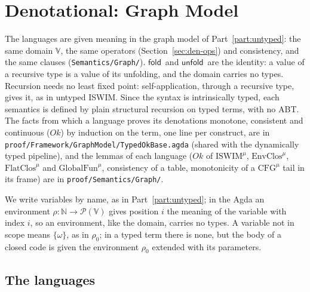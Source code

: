 \documentclass[10pt]{article}
\theoremstyle{acmplain}
\newcommand{\key}[1]{\mathsf{#1}}
\newcommand{\SET}[1]{\mathcal{P}(#1)}
\newcommand{\V}{\mathbb{V}}
\newcommand{\Ml}[1]{\textrm{#1}^{\mu}}                  %
\newcommand{\Mfold}{\key{fold}\,}
\newcommand{\Munfold}{\key{unfold}\,}
\begin{document}
\section{Denotational: Graph Model}\label{sec:m-den}

The languages are given meaning in the graph model of
Part~\ref{part:untyped}: the same domain $\V$, the same operators
(Section~\ref{sec:den-ops}) and consistency, and the same clauses
(\texttt{Semantics/Graph/}). $\Mfold$ and $\Munfold$ are the identity: a
value of a recursive type is a value of its unfolding, and the domain
carries no types. Recursion needs no least fixed point: self-application,
through a recursive type, gives it, as in untyped ISWIM. Since the syntax
is intrinsically typed, each semantics is defined by plain structural
recursion on typed terms, with no ABT. The facts from which a language
proves its denotations monotone, consistent and continuous
($\mathit{Ok}$) by induction on the term, one line per construct, are in
\texttt{proof/Framework/GraphModel/TypedOkBase.agda} (shared with the
dynamically typed pipeline), and the lemmas of each language
($\mathit{Ok}$ of $\Ml{ISWIM}$, $\Ml{EnvClos}$, $\Ml{FlatClos}$ and
$\Ml{GlobalFun}$, consistency of a table, monotonicity of a $\Ml{CFG}$ tail in
its frame) are in \texttt{proof/Semantics/Graph/}.

We write variables by name, as in Part~\ref{part:untyped}; in the Agda an
environment $\rho : \mathbb{N} \to \SET{\V}$ gives position $i$ the
meaning of the variable with index $i$, so an environment, like the
domain, carries no types. A variable not in scope means $\{\omega\}$, as
in $\rho_0$; in a typed term there is none, but the body of a closed code
is given the environment $\rho_0$ extended with its parameters.

\subsection{The languages}
\end{document}
